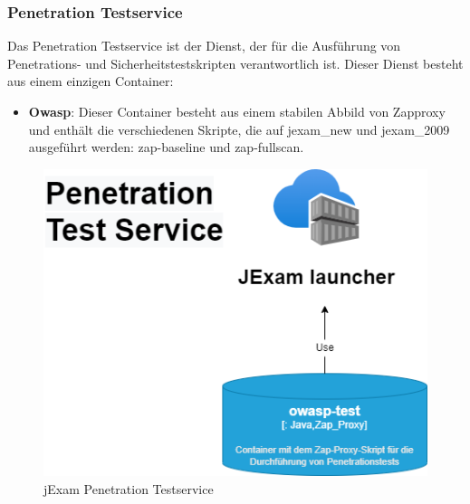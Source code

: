 \subsubsection{Penetration Testservice}

Das Penetration Testservice ist der Dienst, der für die Ausführung
von Penetrations- und Sicherheitstestskripten verantwortlich ist.
Dieser Dienst besteht aus einem einzigen Container:

\begin{itemize}
    \setlength\itemsep{1em}

    \item[] \textbf{Owasp}: Dieser Container besteht aus einem
    stabilen Abbild von Zapproxy und enthält die verschiedenen
    Skripte, die auf \gls{jexam_new} und \gls{jexam_2009}
    ausgeführt werden: zap-baseline und zap-fullscan.

\end{itemize}

\begin{figure}[H]
    \centering
    \includegraphics[scale=0.6]{images/penetration.drawio}
    \caption{jExam Penetration Testservice} \label{fig:pen}
\end{figure}